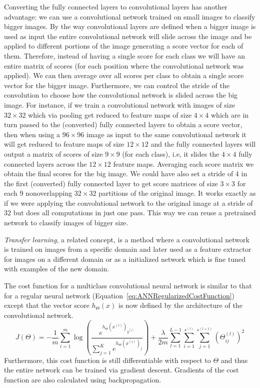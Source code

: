 Converting the fully connected layers to convolutional layers has another advantage: we can use a convolutional network trained on small images to classify bigger images. By the way convolutional layers are defined when a bigger image is used as input the entire convolutional network will slide across the image and be applied to different portions of the image generating a score vector for each of them. Therefore, instead of having a single score for each class we will have an entire matrix of scores (for each position where the convolutional network was applied). We can then average over all scores per class to obtain a single score vector for the bigger image. Furthermore, we can control the stride of the convolution to choose how the convolutional network is slided across the big image.
For instance, if we train a convolutional network with images of size $32\times 32$ which via pooling get reduced to feature maps of size $4\times 4$ which are in turn passed to the (converted) fully connected layers to obtain a score vector, then when using a $96\times 96$ image as input to the same convolutional network it will get reduced to feature maps of size $12 \times 12$ and the fully connected layers will output a matrix of scores of size $9\times 9$ (for each class), i.e, it slides the $4\times 4$ fully connected layers across the $12\times 12$ feature maps. Averaging each score matrix we obtain the final scores for the big image. We could have also  set a stride of 4 in the first (converted) fully connected layer to get score matrices of size $3\times 3$ for each 9 nonoverlapping $32\times 32$ partitions of the original image. It works exactly as if we were applying the convolutional network to the original image at a stride of 32 but does all computations in just one pass. This way we can reuse a pretrained network to classify images of bigger size. 

\emph{Transfer learning}, a related concept, is a method where a  convolutional network is trained on images from a specific domain and later used as a feature extractor for images on a different domain or as a initialized network which is fine tuned with examples of the new domain.

The cost function for a multiclass convolutional neural network is similar to that for a regular neural network (Equation~\ref{eq:ANNRegularizedCostFunction}) except that the vector score $h_\Theta(x)$ is now defined by the architecture of the convolutional network.
\begin{equation}
	J(\Theta) = -\frac{1}{m} \sum_{i=1}^m \log \left ( \frac{ e^{h_\Theta(x^{(i)})_{y^{(i)}}} }{ \sum_{j=1}^K e^{ h_\Theta (x^{(i)})_j} } \right ) + \frac{\lambda}{2m}\sum_{l=1}^{L-1}\sum_{i=1}^{s^{(l)}}\sum_{j=1}^{s^{(l+1)}} \left(\Theta^{(l)}_{ij}\right)^2
	\label{eq:ConvNetCostFunction}
\end{equation}
Furthermore, this cost function is still differentiable with respect to $\Theta$ and thus the entire network can be trained via gradient descent. Gradients of the cost function are also calculated using backpropagation.
